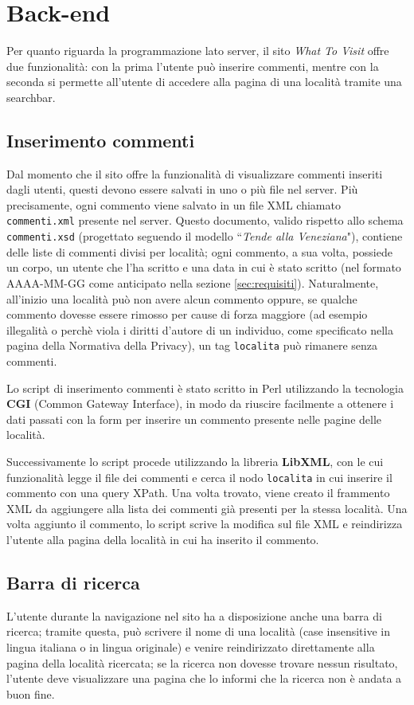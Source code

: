 \section{Back-end}
Per quanto riguarda la programmazione lato server, il sito \textit{What To
Visit} offre due funzionalità: con la prima l'utente può inserire commenti,
mentre con la seconda si permette all'utente di accedere alla pagina di una
località tramite una searchbar.

\subsection{Inserimento commenti}
Dal momento che il sito offre la funzionalità di visualizzare commenti inseriti
dagli utenti, questi devono essere salvati in uno o più file nel server. Più
precisamente, ogni commento viene salvato in un file XML chiamato
\texttt{commenti.xml} presente nel server.
Questo documento, valido rispetto allo schema \texttt{commenti.xsd}
(progettato seguendo il modello ``\textit{Tende alla Veneziana}"), contiene
delle liste di commenti divisi per località; ogni commento, a sua volta,
possiede un corpo, un utente che l'ha scritto e una data in cui è stato
scritto (nel formato AAAA-MM-GG come anticipato nella sezione
\ref{sec:requisiti}). Naturalmente, all'inizio una località può non avere
alcun commento oppure, se qualche commento dovesse essere rimosso per cause di
forza maggiore (ad esempio illegalità o perchè viola i diritti d'autore di un
individuo, come specificato nella pagina della Normativa della Privacy), un
tag \texttt{localita} può rimanere senza commenti.

Lo script di inserimento commenti è stato scritto in Perl utilizzando la
tecnologia \textbf{CGI} (Common Gateway Interface), in modo da riuscire
facilmente a ottenere i dati passati con la form per inserire un commento
presente nelle pagine delle località.

Successivamente lo script procede utilizzando la libreria \textbf{LibXML}, con
le cui funzionalità legge il file dei commenti e cerca il nodo
\texttt{localita} in cui inserire il commento con una query XPath.
Una volta trovato, viene creato il frammento XML da aggiungere alla lista dei
commenti già presenti per la stessa località. Una volta aggiunto il commento,
lo script scrive la modifica sul file XML e reindirizza l'utente alla pagina
della località in cui ha inserito il commento.

\subsection{Barra di ricerca}
L'utente durante la navigazione nel sito ha a disposizione anche una barra di
ricerca; tramite questa, può scrivere il nome di una località (case
insensitive in lingua italiana o in lingua originale) e venire reindirizzato
direttamente alla pagina della località ricercata; se la ricerca non dovesse
trovare nessun risultato, l'utente deve visualizzare una pagina che lo informi
che la ricerca non è andata a buon fine.

